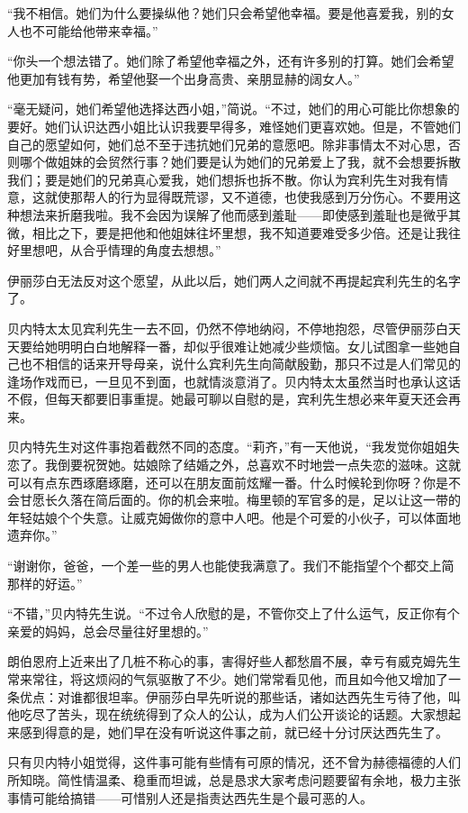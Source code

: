 \par “我不相信。她们为什么要操纵他？她们只会希望他幸福。要是他喜爱我，别的女人也不可能给他带来幸福。”
\par “你头一个想法错了。她们除了希望他幸福之外，还有许多别的打算。她们会希望他更加有钱有势，希望他娶一个出身高贵、亲朋显赫的阔女人。”
\par “毫无疑问，她们希望他选择达西小姐，”简说。“不过，她们的用心可能比你想象的要好。她们认识达西小姐比认识我要早得多，难怪她们更喜欢她。但是，不管她们自己的愿望如何，她们总不至于违抗她们兄弟的意愿吧。除非事情太不对心思，否则哪个做姐妹的会贸然行事？她们要是认为她们的兄弟爱上了我，就不会想要拆散我们；要是她们的兄弟真心爱我，她们想拆也拆不散。你认为宾利先生对我有情意，这就使那帮人的行为显得既荒谬，又不道德，也使我感到万分伤心。不要用这种想法来折磨我啦。我不会因为误解了他而感到羞耻——即使感到羞耻也是微乎其微，相比之下，要是把他和他姐妹往坏里想，我不知道要难受多少倍。还是让我往好里想吧，从合乎情理的角度去想想。”
\par 伊丽莎白无法反对这个愿望，从此以后，她们两人之间就不再提起宾利先生的名字了。
\par 贝内特太太见宾利先生一去不回，仍然不停地纳闷，不停地抱怨，尽管伊丽莎白天天要给她明明白白地解释一番，却似乎很难让她减少些烦恼。女儿试图拿一些她自己也不相信的话来开导母亲，说什么宾利先生向简献殷勤，那只不过是人们常见的逢场作戏而已，一旦见不到面，也就情淡意消了。贝内特太太虽然当时也承认这话不假，但每天都要旧事重提。她最可聊以自慰的是，宾利先生想必来年夏天还会再来。
\par 贝内特先生对这件事抱着截然不同的态度。“莉齐，”有一天他说，“我发觉你姐姐失恋了。我倒要祝贺她。姑娘除了结婚之外，总喜欢不时地尝一点失恋的滋味。这就可以有点东西琢磨琢磨，还可以在朋友面前炫耀一番。什么时候轮到你呀？你是不会甘愿长久落在简后面的。你的机会来啦。梅里顿的军官多的是，足以让这一带的年轻姑娘个个失意。让威克姆做你的意中人吧。他是个可爱的小伙子，可以体面地遗弃你。”
\par “谢谢你，爸爸，一个差一些的男人也能使我满意了。我们不能指望个个都交上简那样的好运。”
\par “不错，”贝内特先生说。“不过令人欣慰的是，不管你交上了什么运气，反正你有个亲爱的妈妈，总会尽量往好里想的。”
\par 朗伯恩府上近来出了几桩不称心的事，害得好些人都愁眉不展，幸亏有威克姆先生常来常往，将这烦闷的气氛驱散了不少。她们常常看见他，而且如今他又增加了一条优点：对谁都很坦率。伊丽莎白早先听说的那些话，诸如达西先生亏待了他，叫他吃尽了苦头，现在统统得到了众人的公认，成为人们公开谈论的话题。大家想起来感到得意的是，她们早在没有听说这件事之前，就已经十分讨厌达西先生了。
\par 只有贝内特小姐觉得，这件事可能有些情有可原的情况，还不曾为赫德福德的人们所知晓。简性情温柔、稳重而坦诚，总是恳求大家考虑问题要留有余地，极力主张事情可能给搞错——可惜别人还是指责达西先生是个最可恶的人。




